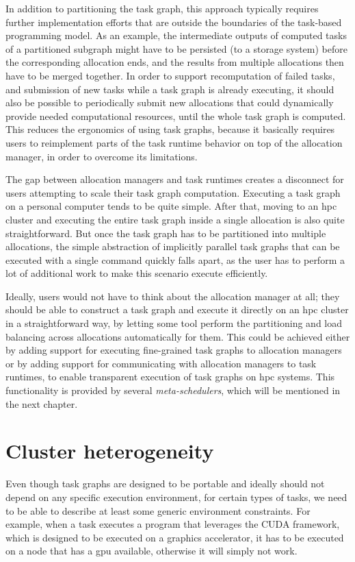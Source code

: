 In addition to partitioning the task graph, this approach typically requires further implementation
efforts that are outside the boundaries of the task-based programming model. As an example, the
intermediate outputs of computed tasks of a partitioned subgraph might have to be persisted (to a
storage system) before the corresponding allocation ends, and the results from multiple allocations
then have to be merged together. In order to support recomputation of failed tasks, and
submission of new tasks while a task graph is already executing, it should also be possible to
periodically submit new allocations that could dynamically provide needed computational resources,
until the whole task graph is computed. This reduces the ergonomics of using task graphs, because
it basically requires users to reimplement parts of the task runtime behavior on top of the
allocation manager, in order to overcome its limitations.

\vspace{5mm}
The gap between allocation managers and task runtimes creates a disconnect for users
attempting to scale their task graph computation. Executing a task graph on a personal computer
tends to be quite simple. After that, moving to an \gls{hpc} cluster and executing the entire task
graph inside a single allocation is also quite straightforward. But once the task graph has to be
partitioned into multiple allocations, the simple abstraction of implicitly parallel task graphs
that can be executed with a single command quickly falls apart, as the user has to perform a lot of
additional work to make this scenario execute efficiently.

Ideally, users would not have to think about the allocation manager at all; they should be able to
construct a task graph and execute it directly on an \gls{hpc} cluster in a
straightforward way, by letting some tool perform the partitioning and load balancing across
allocations automatically for them. This could be achieved either by adding support for executing
fine-grained task graphs to allocation managers or by adding support for communicating with
allocation managers to task runtimes, to enable transparent execution of task graphs on \gls{hpc} systems.
This functionality is provided by several \emph{meta-schedulers}, which will be mentioned in the
next chapter.

\section{Cluster heterogeneity}
Even though task graphs are designed to be portable and ideally should not depend on any specific
execution environment, for certain types of tasks, we need to be able to describe at least some
generic environment constraints. For example, when a task executes a program that leverages the
CUDA framework, which is designed to be executed on a graphics
accelerator, it has to be executed on a node that has a \gls{gpu} available,
otherwise it will simply not work.

